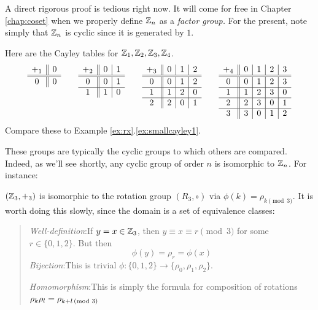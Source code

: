 A direct rigorous proof is tedious right now. It will come for free in Chapter \ref{chap:coset} when we properly define $\mathbb{Z}_n$ as a \emph{factor group.} For the present, note simply that $\mathbb{Z}_n$ is cyclic since it is generated by $1$.

\begin{examples}{}{}
Here are the Cayley tables for $\mathbb{Z}_1,\mathbb{Z}_2,\mathbb{Z}_3,\mathbb{Z}_4$.
\[
\begin{array}[t]{c||c}
	+_1 & 0\\\hline\hline
	0 & 0
\end{array}
\qquad
\begin{array}[t]{c||c|c}
	+_2 & 0 & 1\\\hline\hline
	0 & 0 & 1\\\hline
	1 & 1 & 0
\end{array}
\qquad
\begin{array}[t]{c||c|c|c}
	+_3 & 0 & 1 & 2\\\hline\hline
	0 & 0 & 1 & 2\\\hline
	1 & 1 & 2 & 0\\\hline
	2 & 2 & 0 & 1
\end{array}
\qquad
\begin{array}[t]{c||c|c|c|c}
	+_4 & 0 & 1 & 2 & 3\\\hline\hline
	0 & 0 & 1 & 2 & 3\\\hline
	1 & 1 & 2 & 3 & 0\\\hline
	2 & 2 & 3 & 0 & 1\\\hline
	3 & 3 & 0 & 1 & 2
\end{array}
\]
Compare these to Example \ref*{ex:rx}.\ref{ex:smallcayley1}.
\end{examples}

These groups are typically the cyclic groups to which others are compared. Indeed, as we'll see shortly, any cyclic group of order $n$ is isomorphic to $\mathbb{Z}_n$. For instance:\goodbreak

\begin{example}{}{}
$(\mathbb{Z}_3,+_3)$ is isomorphic to the rotation group $(R_3,\circ)$ via $\phi(k)=\rho_{k\pmod 3}$.\smallbreak
It is worth doing this slowly, since the domain is a set of equivalence classes:
\begin{quote}
	\emph{Well-definition}:\space If $y=x\in\mathbb{Z}_3$, then $y\equiv x\equiv r\pmod 3$ for some $r\in\{0,1,2\}$. But then
	\[\phi(y)=\rho_r=\phi(x)\]
	\emph{Bijection}:\space This is trivial $\phi:\{0,1,2\}\to\{\rho_0,\rho_1,\rho_2\}$.\par
	\emph{Homomorphism}:\space This is simply the formula for composition of rotations
	$\rho_k\rho_l=\rho_{k+l\negthickspace\pmod 3}$
\end{quote}
\end{example}


